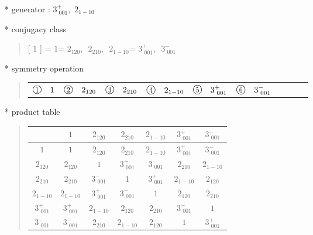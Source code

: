 \documentclass[fleqn,10pt,landscape]{jsarticle}
\begin{document}
* generator : $3^{+}_{\,\,001},\,\,2{}_{1-10}$

* conjugacy class
\begin{quote}
[ $1$ ] = \quad $1$\newline[ $2{}_{120}$ ] = \quad $2{}_{120}$,\,\, $2{}_{210}$,\,\, $2{}_{1-10}$\newline[ $3^{+}_{\,\,001}$ ] = \quad $3^{+}_{\,\,001}$,\,\, $3^{-}_{\,\,001}$\newline
\end{quote}

* symmetry operation
\begin{quote}
\begin{tabular}{llllllllll}
$ {\ooalign{\hfil\resizebox{.8\width}{\height}{1}\hfil\crcr\raise.1ex\hbox{\large$\bigcirc$}}}\quad 1 $ & $ {\ooalign{\hfil\resizebox{.8\width}{\height}{2}\hfil\crcr\raise.1ex\hbox{\large$\bigcirc$}}}\quad 2{}_{120} $ & $ {\ooalign{\hfil\resizebox{.8\width}{\height}{3}\hfil\crcr\raise.1ex\hbox{\large$\bigcirc$}}}\quad 2{}_{210} $ & $ {\ooalign{\hfil\resizebox{.8\width}{\height}{4}\hfil\crcr\raise.1ex\hbox{\large$\bigcirc$}}}\quad 2{}_{1-10} $ & $ {\ooalign{\hfil\resizebox{.8\width}{\height}{5}\hfil\crcr\raise.1ex\hbox{\large$\bigcirc$}}}\quad 3^{+}_{\,\,001} $ & $ {\ooalign{\hfil\resizebox{.8\width}{\height}{6}\hfil\crcr\raise.1ex\hbox{\large$\bigcirc$}}}\quad 3^{-}_{\,\,001} $
\end{tabular}
\end{quote}

* product table
\begin{quote}
\begin{tabular}{ccccccc} \hline \hline
 & $ 1 $ & $ 2{}_{120} $ & $ 2{}_{210} $ & $ 2{}_{1-10} $ & $ 3^{+}_{\,\,001} $ & $ 3^{-}_{\,\,001} $ \\ \hline
$ 1 $ & $ 1 $ & $ 2{}_{120} $ & $ 2{}_{210} $ & $ 2{}_{1-10} $ & $ 3^{+}_{\,\,001} $ & $ 3^{-}_{\,\,001} $ \\
$ 2{}_{120} $ & $ 2{}_{120} $ & $ 1 $ & $ 3^{+}_{\,\,001} $ & $ 3^{-}_{\,\,001} $ & $ 2{}_{210} $ & $ 2{}_{1-10} $ \\
$ 2{}_{210} $ & $ 2{}_{210} $ & $ 3^{-}_{\,\,001} $ & $ 1 $ & $ 3^{+}_{\,\,001} $ & $ 2{}_{1-10} $ & $ 2{}_{120} $ \\
$ 2{}_{1-10} $ & $ 2{}_{1-10} $ & $ 3^{+}_{\,\,001} $ & $ 3^{-}_{\,\,001} $ & $ 1 $ & $ 2{}_{120} $ & $ 2{}_{210} $ \\
$ 3^{+}_{\,\,001} $ & $ 3^{+}_{\,\,001} $ & $ 2{}_{1-10} $ & $ 2{}_{120} $ & $ 2{}_{210} $ & $ 3^{-}_{\,\,001} $ & $ 1 $ \\
$ 3^{-}_{\,\,001} $ & $ 3^{-}_{\,\,001} $ & $ 2{}_{210} $ & $ 2{}_{1-10} $ & $ 2{}_{120} $ & $ 1 $ & $ 3^{+}_{\,\,001} $ \\
 \hline \hline
\end{tabular}
\end{quote}
\end{document}
